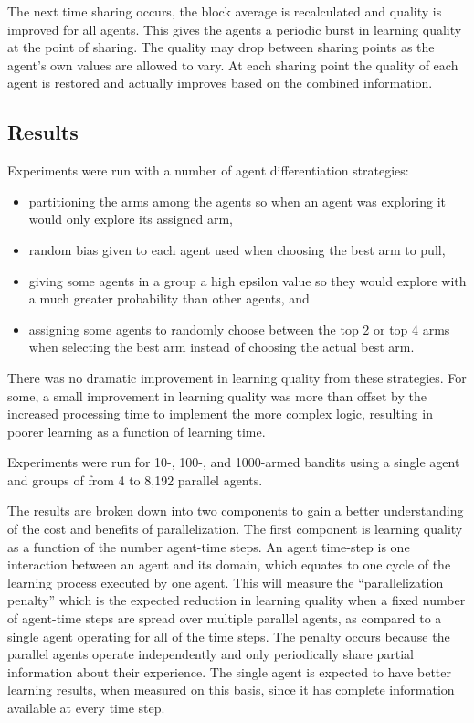 \begin{flushleft}
The next time sharing occurs, the block average is recalculated and quality is improved for all agents.  This gives the agents a periodic burst in learning quality at the point of sharing.  The quality may drop between sharing points as the agent’s own values are allowed to vary.  At each sharing point the quality of each agent is restored and actually improves based on the combined information.

\subsection{Results}
Experiments were run with a number of agent differentiation strategies:
\begin{itemize}
\item
partitioning the arms among the agents so when an agent was exploring it would only explore its assigned arm,
\item
random bias given to each agent used when choosing the best arm to pull,
\item
giving some agents in a group a high epsilon value so they would explore with a much greater probability than other agents, and
\item
assigning some agents to randomly choose between the top 2 or top 4 arms when selecting the best arm instead of choosing the actual best arm.
\end{itemize}

There was no dramatic improvement in learning quality from these strategies.  For some, a small improvement in learning quality was more than offset by the increased processing time to implement the more complex logic, resulting in poorer learning as a function of learning time.

Experiments were run for 10-, 100-, and 1000-armed bandits using a single agent and groups of from 4 to 8,192 parallel agents.

The results are broken down into two components to gain a better understanding of the cost and benefits of parallelization.  The first component is learning quality as a function of the number agent-time steps.  An agent time-step is one interaction between an agent and its domain, which equates to one cycle of the learning process executed by one agent.  This will measure the “parallelization penalty” which is the expected reduction in learning quality when a fixed number of agent-time steps are spread over multiple parallel agents, as compared to a single agent operating for all of the time steps.  The penalty occurs because the parallel agents operate independently and only periodically share partial information about their experience.  The single agent is expected to have better learning results, when measured on this basis, since it has complete information available at every time step.


\end{flushleft}
